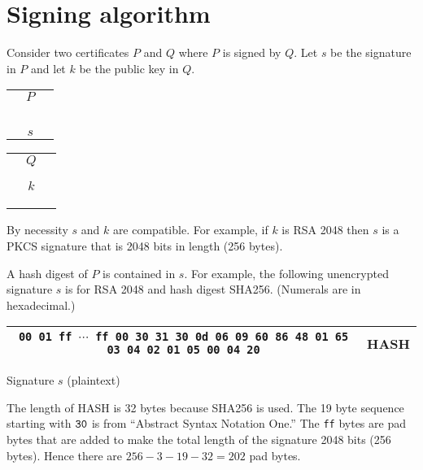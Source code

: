 \documentclass[12pt]{article}
\begin{document}
\section{Signing algorithm}

\noindent
Consider two certificates $P$ and $Q$ where $P$ is signed by $Q$.
Let $s$ be the signature in $P$ and let $k$ be the public
key in $Q$.

\begin{center}
\begin{tabular}{|c|}
\hline
$\quad P\quad$\\
\\
\\
\\
\\
\\
\hline
$s$\\
\hline
\end{tabular}
\qquad
\begin{tabular}{|c|}
\hline
$\quad Q\quad$\\
\\
\\
\hline
$k$\\
\hline
\\
\\
\\
\hline
\end{tabular}
\end{center}

\noindent
By necessity $s$ and $k$ are compatible.
For example, if $k$ is RSA 2048 then $s$ is a PKCS signature that is 2048 bits in length
(256 bytes).

\bigskip
\noindent
A hash digest of $P$ is contained in $s$.
For example, the following unencrypted signature $s$ is for RSA 2048 and hash digest SHA256.
(Numerals are in hexadecimal.)

\begin{center}
\begin{tabular}{|c|c|}
\hline
{\footnotesize\tt 00 01 ff $\cdots$ ff 00 30 31 30 0d 06 09 60 86 48 01 65 03 04 02 01 05 00 04 20} & HASH\\
\hline
\end{tabular}

\medskip
Signature $s$ (plaintext)
\end{center}

\noindent
The length of HASH is 32 bytes because SHA256 is used.
The 19 byte sequence starting with $\tt 30$ is from
``Abstract Syntax Notation One.''
The {\tt ff} bytes are pad bytes that are added to make the total length of the signature 2048 bits (256 bytes).
Hence there are $256-3-19-32=202$ pad bytes.
\end{document}
